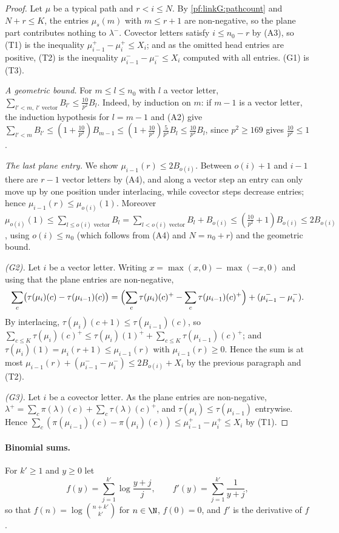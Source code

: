 \begin{proof}
Let $\mu$ be a typical path and $r<i\le N$. By \cref{pf:linkG:pathcount} and $N+r\le K$, the entries $\mu_s(m)$ with $m\le r+1$
are non-negative, so the plane part contributes nothing to $\lambda^-$. Covector letters satisfy $i\le n_0-r$ by (A3), so
(T1) is the inequality $\mu_{i-1}^+-\mu_i^+\le X_i$; and as the omitted head entries are positive, (T2) is the inequality
$\mu_{i-1}^--\mu_i^-\le X_i$ computed with all entries. (G1) is (T3).

\emph{A geometric bound.} For $m\le l\le n_0$ with $l$ a vector letter,
$\sum_{l'<m,\ l'\text{ vector}}B_{l'}\le\frac{10}{p^2}B_l$. Indeed, by induction on $m$: if $m-1$ is a vector letter, the
induction hypothesis for $l=m-1$ and (A2) give $\sum_{l'<m}B_{l'}\le(1+\frac{10}{p^2})B_{m-1}\le(1+\frac{10}{p^2})\frac5{p^2}B_l\le
\frac{10}{p^2}B_l$, since $p^2\ge169$ gives $\frac{10}{p^2}\le1$.

\emph{The last plane entry.} We show $\mu_{i-1}(r)\le2B_{o(i)}$. Between $o(i)+1$ and $i-1$ there are $r-1$ vector letters by (A4),
and along a vector step an entry can only move up by one position under interlacing, while covector steps decrease
entries; hence $\mu_{i-1}(r)\le\mu_{o(i)}(1)$. Moreover $\mu_{o(i)}(1)\le\sum_{l\le o(i)\text{ vector}}B_l=
\sum_{l<o(i)\text{ vector}}B_l+B_{o(i)}\le(\frac{10}{p^2}+1)B_{o(i)}\le2B_{o(i)}$, using $o(i)\le n_0$ (which follows from (A4) and
$N=n_0+r$) and the geometric bound.

\emph{(G2).} Let $i$ be a vector letter. Writing $x=\max(x,0)-\max(-x,0)$ and using that the plane entries are
non-negative,
\[
\sum_c\bigl(\tau(\mu_i)(c)-\tau(\mu_{i-1})(c)\bigr)=\Bigl(\sum_c\tau(\mu_i)(c)^+-\sum_c\tau(\mu_{i-1})(c)^+\Bigr)+(\mu_{i-1}^--\mu_i^-).
\]
By interlacing, $\tau(\mu_i)(c+1)\le\tau(\mu_{i-1})(c)$, so $\sum_{c\le K}\tau(\mu_i)(c)^+\le\tau(\mu_i)(1)^++\sum_{c\le K}\tau(\mu_{i-1})(c)^+$;
and $\tau(\mu_i)(1)=\mu_i(r+1)\le\mu_{i-1}(r)$ with $\mu_{i-1}(r)\ge0$. Hence the sum is at most
$\mu_{i-1}(r)+(\mu_{i-1}^--\mu_i^-)\le2B_{o(i)}+X_i$ by the previous paragraph and (T2).

\emph{(G3).} Let $i$ be a covector letter. As the plane entries are non-negative, $\lambda^+=\sum_c\pi(\lambda)(c)+\sum_c\tau(\lambda)(c)^+$,
and $\tau(\mu_i)\le\tau(\mu_{i-1})$ entrywise. Hence $\sum_c(\pi(\mu_{i-1})(c)-\pi(\mu_i)(c))\le\mu_{i-1}^+-\mu_i^+\le X_i$ by (T1).
\end{proof}

\paragraph{Binomial sums.} For $k'\ge1$ and $y\ge0$ let
\[
f(y)=\sum_{j=1}^{k'}\log\frac{y+j}{j},\qquad f'(y)=\sum_{j=1}^{k'}\frac1{y+j},
\]
so that $f(n)=\log\binom{n+k'}{k'}$ for $n\in\N$, $f(0)=0$, and $f'$ is the derivative of $f$.

